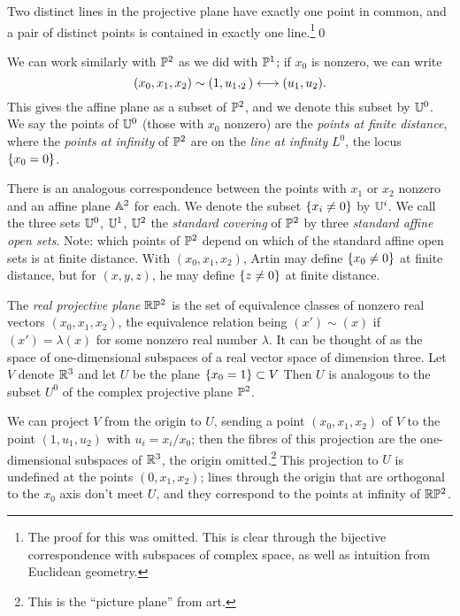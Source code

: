 \documentclass{report}
\begin{document}
\begin{lemma}
  Two distinct lines in the projective plane have exactly one point in common, and a pair of distinct points is contained in exactly one line.\footnote{The proof for this was omitted.
  This is clear through the bijective correspondence with subspaces of complex space, as well as intuition from Euclidean geometry.}\qed
\end{lemma}

We can work similarly with $\PP^2$ as we did with $\PP^1$;
if $x_0$ is nonzero, we can write 
\[\prn{x_0,x_1,x_2} \sim \prn{1,u_1,_2} \longleftrightarrow (u_1,u_2).\]
This gives the affine plane as a subset of $\PP^2$, and we denote this subset by $\UU^0$.
We say the points of $\UU^0$ (those with $x_0$ nonzero) are the \emph{points at finite distance}, where the \emph{points at infinity} of $\PP^2$ are on the \emph{line at infinity} $L^0$, the locus $\cbr{x_0 = 0}$.

There is an analogous correspondence between the points with $x_1$ or $x_2$ nonzero and an affine plane $\AA^2$ for each.
We denote the subset $\cbr{x_i \neq 0}$ by $\UU^i$.
We call the three sets $\UU^0$, $\UU^1$, $\UU^2$ the \emph{standard covering} of $\PP^2$ by three \emph{standard affine open sets}.
Note: which points of $\PP^2$ depend on which of the standard affine open sets is at finite distance.
With $(x_0,x_1,x_2)$, Artin may define $\cbr{x_0 \neq 0}$ at finite distance, but for $(x,y,z)$, he may define $\cbr{z \neq 0}$ at finite distance.

The \emph{real projective plane} $\RR \PP^2$ is the set of equivalence classes of nonzero real vectors $(x_0,x_1,x_2)$, the equivalence relation being $(x') \sim (x)$ if $(x') = \lambda(x)$ for some nonzero real number $\lambda$.
It can be thought of as the space of one-dimensional subspaces of a real vector space of dimension three.
Let $V$ denote $\RR^3$ and let $U$ be the plane $\cbr{x_0 = 1} \subset V$
Then $U$ is analogous to the subset $U^0$ of the complex projective plane $\PP^2$.

We can project $V$ from the origin to $U$, sending a point $(x_0,x_1,x_2)$ of $V$ to the point $(1,u_1,u_2)$ with $u_i = x_i/x_0$; then the fibres of this projection are the one-dimensional subspaces of $\RR^3$, the origin omitted.\footnote{This is the ``picture plane'' from art.}
This projection to $U$ is undefined at the points $(0,x_1,x_2)$; lines through the origin that are orthogonal to the $x_0$ axis don't meet $U$, and they correspond to the points at infinity of $\RR\PP^2$.
\end{document}

